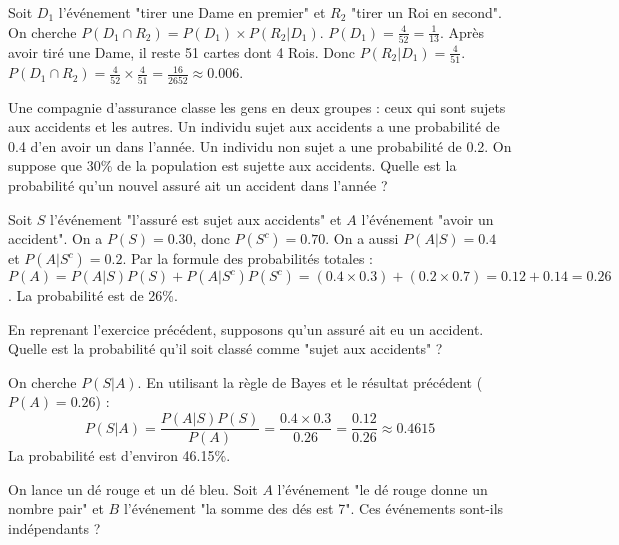 \begin{correctionbox}
Soit $D_1$ l'événement "tirer une Dame en premier" et $R_2$ "tirer un Roi en second".
On cherche $P(D_1 \cap R_2) = P(D_1) \times P(R_2|D_1)$.
$P(D_1) = \frac{4}{52} = \frac{1}{13}$.
Après avoir tiré une Dame, il reste 51 cartes dont 4 Rois. Donc $P(R_2|D_1) = \frac{4}{51}$.
$P(D_1 \cap R_2) = \frac{4}{52} \times \frac{4}{51} = \frac{16}{2652} \approx 0.006$.
\end{correctionbox}

\begin{exercicebox}
Une compagnie d'assurance classe les gens en deux groupes : ceux qui sont sujets aux accidents et les autres. Un individu sujet aux accidents a une probabilité de 0.4 d'en avoir un dans l'année. Un individu non sujet a une probabilité de 0.2. On suppose que 30\% de la population est sujette aux accidents. Quelle est la probabilité qu'un nouvel assuré ait un accident dans l'année ?
\end{exercicebox}

\begin{correctionbox}
Soit $S$ l'événement "l'assuré est sujet aux accidents" et $A$ l'événement "avoir un accident".
On a $P(S) = 0.30$, donc $P(S^c) = 0.70$.
On a aussi $P(A|S) = 0.4$ et $P(A|S^c) = 0.2$.
Par la formule des probabilités totales :
$P(A) = P(A|S)P(S) + P(A|S^c)P(S^c) = (0.4 \times 0.3) + (0.2 \times 0.7) = 0.12 + 0.14 = 0.26$.
La probabilité est de 26\%.
\end{correctionbox}

\begin{exercicebox}
En reprenant l'exercice précédent, supposons qu'un assuré ait eu un accident. Quelle est la probabilité qu'il soit classé comme "sujet aux accidents" ?
\end{exercicebox}

\begin{correctionbox}
On cherche $P(S|A)$. En utilisant la règle de Bayes et le résultat précédent ($P(A)=0.26$) :
$$ P(S|A) = \frac{P(A|S)P(S)}{P(A)} = \frac{0.4 \times 0.3}{0.26} = \frac{0.12}{0.26} \approx 0.4615 $$
La probabilité est d'environ 46.15\%.
\end{correctionbox}

\begin{exercicebox}[Indépendance]
On lance un dé rouge et un dé bleu. Soit $A$ l'événement "le dé rouge donne un nombre pair" et $B$ l'événement "la somme des dés est 7". Ces événements sont-ils indépendants ?
\end{exercicebox}

